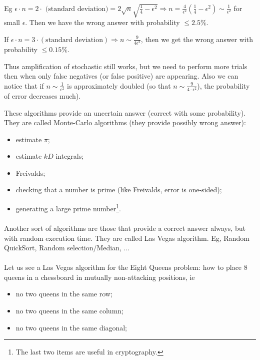 \documentclass[11pt,a4paper]{scrartcl} %
\theoremstyle{definition}
\begin{document}
\begin{itemize}
	Eg $\epsilon \cdot n=2\cdot \text{ (standard deviation)}=2\sqrt{n}\sqrt{\frac{1}{4}-\epsilon^2} \Rightarrow n=\frac{4}{\epsilon^2}\left(\frac{1}{4}-\epsilon^2\right)\sim \frac{1}{\epsilon^2}$ for small $\epsilon$. Then we have the wrong answer with probability $\leq 2.5\%$.
	
	If $\epsilon\cdot n=3\cdot (\text{standard deviation})\Rightarrow n\sim \frac{9}{4\epsilon^2}$, then we get the wrong answer with probability $\leq 0.15\%$.
	
	Thus amplification of stochastic still works, but we need to perform more trials then when only false negatives (or false positive) are appearing. Also we can notice that if $n\sim \frac{1}{\epsilon^2}$ is approximately doubled (so that $n\sim \frac{9}{4\cdot \epsilon^2}$), the probability of error decreases much).
	\end{itemize}
	
	These algorithms provide an uncertain answer (correct with some probability). They are called Monte-Carlo algorithms (they provide possibly wrong answer):
	\begin{itemize}
		\item estimate $\pi$;
		\item estimate $kD$ integrals;
		\item Freivalds;
		\item checking that a number is prime (like Freivalds, error is one-sided);
		\item generating a large prime number\footnote{The last two items are useful in cryptography.}.
	\end{itemize}
\paragraph{}

Another sort of algorithms are those that provide a correct answer always, but with random execution time. They are called Las Vegas algorithm. Eg, Random QuickSort, Random selection/Median, ...

\paragraph{}

Let us see a Las Vegas algorithm for the Eight Queens problem: how to place 8 queens in a chessboard in mutually non-attacking positions, ie
\begin{itemize}
	\item no two queens in the same row;
	\item no two queens in the same column;
	\item no two queens in the same diagonal;
\end{itemize}
\end{document}
